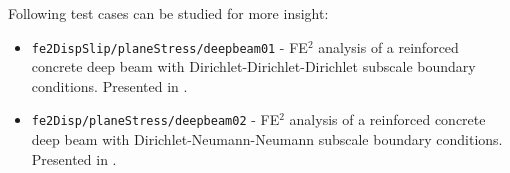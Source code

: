 \documentclass[11pt]{article}
\begin{document}
Following test cases can be studied for more insight:
\begin{itemize}
    \item \texttt{fe2DispSlip/planeStress/deepbeam01} - FE$^2$ analysis of a reinforced concrete deep beam with Dirichlet-Dirichlet-Dirichlet subscale boundary conditions. Presented in \cite{PaperB}.
    \item \texttt{fe2Disp/planeStress/deepbeam02} - FE$^2$ analysis of a reinforced concrete deep beam with Dirichlet-Neumann-Neumann subscale boundary conditions. Presented in \cite{PaperC}.
\end{itemize}

\clearpage

\printbibliography
\end{document}
